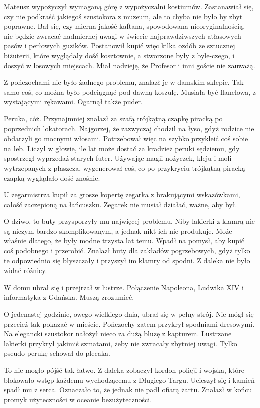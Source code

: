 \divider{}

Mateusz wypożyczył wymaganą górę z wypożyczalni kostiumów.
Zastanawiał się, czy nie podkraść jakiegoś szustokora z muzeum, ale to chyba nie było by zbyt poprawne.
Bał się, czy mierna jakość kaftana, spowodowana nieoryginalnością, nie będzie zwracać nadmiernej uwagi w świecie najprawdziwszych atłasowych pasów i perłowych guzików.
Postanowił kupić więc kilka ozdób ze sztucznej biżuterii, które wyglądały dość kosztownie, a stworzone były z 
byle-czego, i doszyć w losowych miejscach. Miał nadzieję, że Profesor i inni goście nie zauważą.

Z pończochami nie było żadnego problemu, znalazł je w damskim sklepie.
Tak samo coś, co można było podciągnąć pod dawną koszulę.
Musiała być flanelowa, z wystającymi rękawami.
Ogarnął także puder.

Peruka, cóż. Przynajmniej znalazł za szafą trójkątną czapkę piracką po poprzednich lokatorach.
Najgorzej, że zazwyczaj chodził na łyso, gdyż rodzice nie obdarzyli go mocnymi włosami.
Potrzebował więc na szybko przykleić coś sobie na łeb.
Liczył w głowie, ile lat może dostać za kradzież peruki sędziemu, gdy spostrzegł wyprzedaż starych futer.
Używając magii nożyczek, kleju i moli wytrzepanych z płaszcza, wygenerował coś, co po przykryciu trójkątną piracką czapką wyglądało dość znośnie.

U zegarmistrza kupił za grosze kopertę zegarka z brakującymi wskazówkami, całość zaczepioną na łańcuszku.
Zegarek nie musiał działać, ważne, aby był.

O dziwo, to buty przysporzyły mu najwięcej problemu.
Niby lakierki z klamrą nie są niczym bardzo skomplikowanym, a jednak nikt ich nie produkuje.
Może właśnie dlatego, że były modne trzysta lat temu.
Wpadł na pomysł, aby kupić coś podobnego i przerobić. 
Znalazł buty dla zakładów pogrzebowych, gdyż tylko te odpowiednio się błyszczały i przyszył im klamry od spodni.
Z daleka nie było widać różnicy.

W domu ubrał się i przejrzał w lustrze.
Połączenie Napoleona, Ludwika XIV i informatyka z Gdańska.
Muszą zrozumieć.

O jedenastej godzinie, owego wielkiego dnia, ubrał się w pełny strój.
Nie mógł się przecież tak pokazać w mieście.
Pończochy zatem przykrył spodniami dresowymi.
Na elegancki szustokor nałożył nieco za dużą bluzę z kapturem.
Lustrzane lakierki przykrył jakimiś szmatami, żeby nie zwracały zbytniej uwagi.
Tylko pseudo-perukę schował do plecaka.

To nie mogło pójść tak łatwo.
Z daleka zobaczył kordon policji i wojska, które blokowało wstęp każdemu wychodzącemu z Długiego Targu.
Ucieszył się i kamień spadł mu z serca. Oznaczało to, że jednak nie padł ofiarą żartu.
Znalazł w końcu promyk użyteczności w oceanie bezużyteczności.

